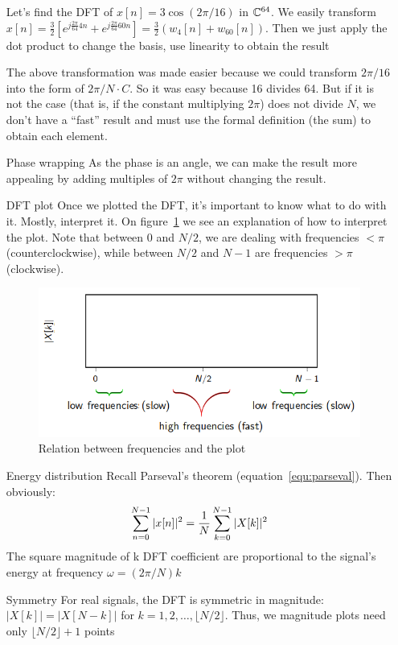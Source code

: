 \documentclass[11pt,a4paper]{article}
\begin{document}
\begin{itemize}
	      \begin{example}
		      Let's find the DFT of $x[n] = 3\cos(2\pi/16)$ in $\C^{64}$. We easily transform $x[n] = \frac{3}{2}\left[e^{j\frac{2\pi}{64}4n} + e^{j \frac{2\pi}{64}60n}\right] = \frac{3}{2}(w_4[n] + w_{60}[n])$. Then we just apply the dot product to change the basis, use linearity to obtain the result
	      \end{example}
	      \begin{example}
		      The above transformation was made easier because we could transform $2\pi/16$ into the form of $2\pi/N \cdot C$. So it was easy because 16 divides 64. But if it is not the case (that is, if the constant multiplying $2\pi$) does not divide $N$, we don't have a ``fast'' result and must use the formal definition (the sum) to obtain each element.
	      \end{example}
	\item[Phase wrapping]As the phase is an angle, we can make the result more appealing by adding multiples of $2\pi$ without changing the result.
	\item[DFT plot]Once we plotted the DFT, it's important to know what to do with it. Mostly, interpret it. On figure\ \ref{fig_dft_interpret} we see an explanation of how to interpret the plot. Note that between 0 and $N/2$, we are dealing with frequencies $< \pi$ (counterclockwise), while between $N/2$ and $N-1$ are frequencies $> \pi$ (clockwise).
	      \begin{figure}
		      \centering%
		      \includegraphics[scale=0.5]{images/dft_interpret}%
		      \caption{Relation between frequencies and the plot}%
		      \label{fig_dft_interpret}%
	      \end{figure}
	\item[Energy distribution]Recall Parseval's theorem (equation\ \ref{equ:parseval}). Then obviously:
	      \begin{equation}
		      \somme{N-1}{n=0}|x[n]|^2 = \frac{1}{N}\somme{N-1}{k=0}|X[k]|^2
	      \end{equation}
	      The square magnitude of k DFT coefficient are proportional to the signal's energy at frequency $\omega = (2\pi/N)k$
	\item[Symmetry]For real signals, the DFT is symmetric in magnitude: ${|X[k]|=|X[N-k]|}$ for $k = 1,2,\ldots,\lfloor N/2 \rfloor$. Thus, we magnitude plots need only $\lfloor N/2 \rfloor +1$ points
\end{itemize}
\end{document}

